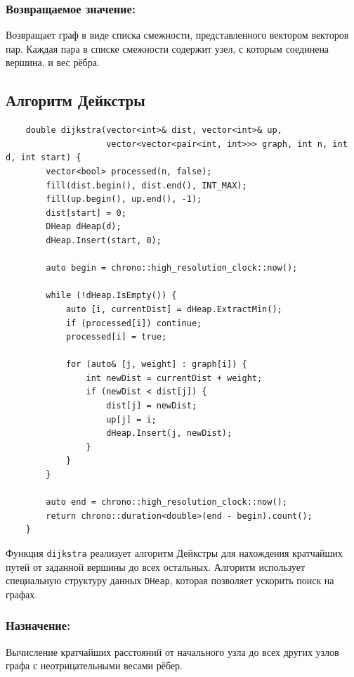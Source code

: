 \subsubsection*{Возвращаемое значение:}
Возвращает граф в виде списка смежности, представленного вектором векторов пар. Каждая пара в списке смежности содержит узел, с которым соединена вершина, и вес рёбра.



\subsection*{Алгоритм Дейкстры}

\begin{verbatim}
    double dijkstra(vector<int>& dist, vector<int>& up, 
                    vector<vector<pair<int, int>>> graph, int n, int d, int start) {
        vector<bool> processed(n, false);
        fill(dist.begin(), dist.end(), INT_MAX);
        fill(up.begin(), up.end(), -1);
        dist[start] = 0;
        DHeap dHeap(d);
        dHeap.Insert(start, 0);
    
        auto begin = chrono::high_resolution_clock::now();
    
        while (!dHeap.IsEmpty()) {
            auto [i, currentDist] = dHeap.ExtractMin();
            if (processed[i]) continue;
            processed[i] = true;
            
            for (auto& [j, weight] : graph[i]) {
                int newDist = currentDist + weight;
                if (newDist < dist[j]) {
                    dist[j] = newDist;
                    up[j] = i;
                    dHeap.Insert(j, newDist);
                }
            }
        }
    
        auto end = chrono::high_resolution_clock::now();
        return chrono::duration<double>(end - begin).count();
    }
    \end{verbatim}

Функция \texttt{dijkstra} реализует алгоритм Дейкстры для нахождения кратчайших путей от заданной вершины до всех остальных. Алгоритм использует специальную структуру данных \texttt{DHeap}, которая позволяет ускорить поиск на графах.

\subsubsection*{Назначение:}
Вычисление кратчайших расстояний от начального узла до всех других узлов графа с неотрицательными весами рёбер.


